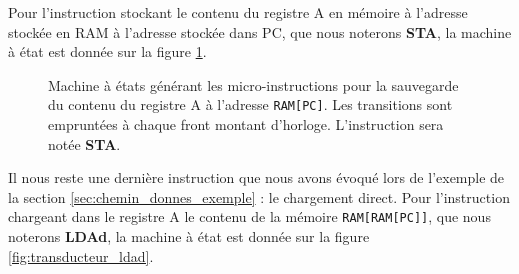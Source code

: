Pour l'instruction stockant le contenu du registre A en mémoire à l'adresse stockée en RAM à l'adresse stockée dans PC, que nous noterons \textbf{STA}, la machine à état est donnée sur la figure \ref{fig:transducteur_sta}.

\begin{figure}[htbp]
  \centering{}
  \caption{\label{fig:transducteur_sta} Machine à états générant les micro-instructions pour la sauvegarde du contenu du registre A à l'adresse \texttt{RAM[PC]}. Les transitions sont empruntées à chaque front montant d'horloge. L'instruction sera notée \textbf{STA}.}
\end{figure}

Il nous reste une dernière instruction que nous avons évoqué lors de l'exemple de la section \ref{sec:chemin_donnes_exemple} : le chargement direct. Pour l'instruction chargeant dans le registre A le contenu de la mémoire \texttt{RAM[RAM[PC]]}, que nous noterons \textbf{LDAd}, la machine à état est donnée sur la figure \ref{fig:transducteur_ldad}.

